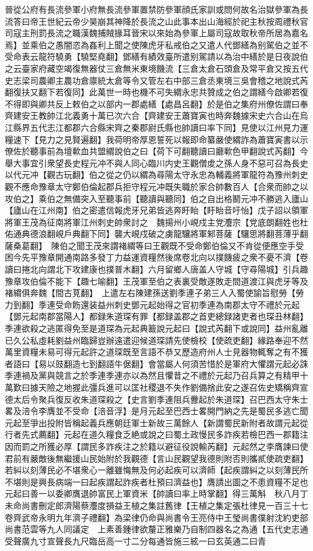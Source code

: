 晉從公府有長流參軍小府無長流參軍置禁防參軍顔氏家訓或問何故名治獄參軍為長流答曰帝王世紀云帝少昊崩其神降於長流之山此事本出山海經於祀主秋按周禮秋官司寇主刑罰長流之職漢魏捕賊掾耳晉宋以來始為參軍上屬司寇故取秋帝所居為嘉名焉】並乘伯之愚闇恣為姦利上聞之使陳虎牙私戒伯之又遣人代鄧繕為别駕伯之並不受命表云龍符驍勇【驍堅堯翻】鄧繕有績效臺所遣别駕請以為治中繕於是日夜說伯之云臺家府藏空竭復無器仗三倉無米東境饑流【三倉太倉石頭倉及常平倉又按五代史志梁司農卿主農功倉廪統太倉等令又管左右中部三倉丞東境三吳會稽之地說式芮翻復扶又翻下若復同】此萬世一時也機不可失緭永忠共贊成之伯之謂繕今啟卿若復不得即與卿共反上敕伯之以部内一郡處繕【處昌呂翻】於是伯之集府州僚佐謂曰奉齊建安王教帥江北義勇十萬已次六合【齊建安王蕭寶寅也時奔魏據宋史六合山在烏江縣界五代志江都郡六合縣宋齊之秦郡尉氏縣也帥讀曰率下同】見使以江州見力運糧速下【見力之見賢遍翻】我荷明帝厚恩誓死以報即命纂嚴使緭詐為蕭寶寅書以示僚佐於聽事前為壇㰱血共盟緭說伯之曰【荷下可翻聽讀曰廳㰱色甲翻說式芮翻】今舉大事宜引衆望長史程元冲不與人同心臨川内史王觀僧䖍之孫人身不惡可召為長史以代元冲【觀古玩翻】伯之從之仍以緭為尋陽太守永忠為輔義將軍龍符為豫州刺史觀不應命豫章太守鄭伯倫起郡兵拒守程元冲既失職於家合帥數百人【合衆而帥之以攻伯之】乘伯之無備突入至聽事前【聽讀與聽同】伯之自出格鬭元冲不勝逃入廬山【廬山在江州南】伯之密遣信報虎牙兄弟皆逃奔盱眙【盱眙音吁怡】戊子詔以領軍將軍王茂為征南將軍江州刺史帥衆討之　魏揚州小峴戍主党灋宗【党底朗翻姓也杜佑通典德浪翻峴戶典翻下同】襲大峴戍破之虜龍驤將軍邾菩薩【驤思將翻菩薄乎翻薩桑葛翻】　陳伯之聞王茂來謂褚緭等曰王觀既不受命鄭伯倫又不肯從便應空手受困今先平豫章開通南路多發丁力益運資糧然後席卷北向以撲饑疲之衆不憂不濟【卷讀曰捲北向謂北下攻建康也撲普木翻】六月留鄉人唐盖人守城【守尋陽城】引兵趣豫章攻伯倫不能下【趣七喻翻】王茂軍至伯之表裏受敵遂敗走間道渡江與虎牙等及褚緭俱奔魏【間古莧翻】　上遣左右陳建孫送劉季連子弟三人入蜀使諭旨慰勞【勞力到翻】季連受命飭還装益州刺史鄧元起始得之官初季連為南郡太守不禮於元起【鄧元起南郡當陽人】都録朱道琛有罪【都録盖郡之首吏總録諸吏者也琛丑林翻】季連欲殺之逃匿得免至是道琛為元起典籖說元起曰【說式芮翻下或說同】益州亂離已久公私虛耗劉益州臨歸豈辦遠遣迎候道琛請先使檢校【使疏吏翻】緣路奉迎不然萬里資糧未易可得元起許之道琛既至言語不恭又歷造府州人士見器物輒奪之有不獲者語曰【易以豉翻造七到翻語牛倨翻】會當屬人何須苦惜於是軍府大懼謂元起必誅季連禍及黨與競言之於季連季連亦以為然且懼昔之不禮於元起乃召兵算之有精甲十萬歎曰據天險之地握此彊兵進可以匡社稷退不失作劉備捨此安之遂召佐史矯稱齊宣德太后令聚兵復反收朱道琛殺之【史言劉季連阻兵釁起於朱道琛】召巴西太守朱士畧及涪令李膺並不受命【涪音浮】是月元起至巴西士畧開門納之先是蜀民多逃亡聞元起至爭出投附皆稱起義兵應朝廷軍士新故三萬餘人【新謂蜀民新附者故謂元起從行者先式薦翻】元起在道久糧食乏絶或說之曰蜀土政慢民多詐疾若檢巴西一郡籍注因而罰之所獲必厚【謂民多詐疾注之於籍以避征役說輸芮翻】元起然之李膺諫曰使君前有嚴敵後無繼援山民始附於我觀德【言山民觀望我德則附否則攜貳使疏吏翻】若糾以刻薄民必不堪衆心一離雖悔無及何必起疾可以濟師【起疾謂糾之以刻薄民所不堪則是興長病端一曰起疾謂起詐疾者杜預曰濟益也】膺請出圖之不患資糧不足也元起曰善一以委卿膺退帥富民上軍資米【帥讀曰率上時掌翻】得三萬斛　秋八月丁未命尚書刪定郎濟陽蔡灋度損益王植之集註舊律【王植之集定張杜律見一百三十七卷齊武帝永明九年濟子禮翻】為梁律仍命與尚書令王亮侍中王瑩尚書僕射沈約吏部尚書范雲等九人同議定　上素善鍾律欲釐正雅樂乃自制四器名之為通【五代史志通受聲廣九寸宣聲長九尺臨岳高一寸二分每通皆施三絃一曰玄英通二曰青